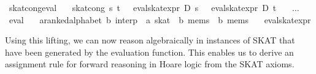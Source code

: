 \documentclass{llncs}
\begin{document}
\begin{isabellebody}
\isanewline
{}\isamarkupfalse%
\ skat{}cong{}eval{}\ {}\isanewline
\ \ skat{}cong\ s\ t\ {}\ {}{}{}\ eval{}skat{}expr\ D\ s\ {}\ {}\ eval{}skat{}expr\ D\ t\ {}{}\isanewline
\ \ $\dots$\isanewline
\isanewline
{}\isamarkupfalse%
\ eval\ {}{}\isanewline
\ \ {}{}{}a{}{}ranked{}alphabet{}\ {}b{}\ interp\ {}\ {}a\ skat\ {}\ {}b\ mems\ {}\ {}b\ mems{}\isanewline
\ \ \ eval{}skat{}expr\isanewline
\end{isabellebody}

\noindent Using this lifting, we can now reason algebraically in
instances of SKAT that have been generated by the evaluation
function. This enables us to derive an assignment rule for forward
reasoning in Hoare logic from the SKAT axioms.
\end{document}
